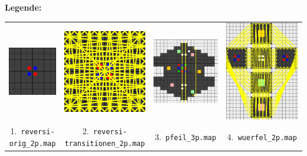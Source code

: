 \documentclass[12pt,a4paper,bibliography=totocnumbered,listof=totocnumbered,ngerman]{scrartcl}
\begin{document}
\textbf{Legende:}\\[1em]
\begin{tabular}{cccc}
  \includegraphics[width=0.22\linewidth]{maps/reversi-orig_2p.png}&
  \includegraphics[width=0.22\linewidth]{maps/reversi-transitionen_2p.png}&
  \includegraphics[width=0.22\linewidth]{maps/pfeil_3p.png}&
  \includegraphics[width=0.22\linewidth]{maps/wuerfel_2p.png}
  \\
  \scriptsize 1.~\texttt{reversi-orig\_2p.map}&
  \scriptsize 2.~\texttt{reversi-transitionen\_2p.map}&
  \scriptsize 3.~\texttt{pfeil\_3p.map}&
  \scriptsize 4.~\texttt{wuerfel\_2p.map}
\end{tabular}
\end{document}
